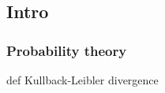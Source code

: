 \hypertarget{intro}{%
\subsection{Intro}\label{intro}}

\hypertarget{probability-theory}{%
\subsubsection{Probability theory}\label{probability-theory}}

def Kullback-Leibler divergence
